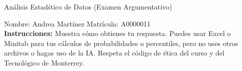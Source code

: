 \documentclass[8pt]{report}
\begin{document}
\newpage



\begin{center}
{An\'alisis Estad\'stico de Datos (Examen Argumentativo)}
\end{center}

Nombre: \underline{\hspace*{.2in}}
Andrea Martínez
\underline{\hspace*{.2in}} \quad Matr\'icula:\underline{\hspace*{.2in}}
A0000011
\underline{\hspace*{.2in}} \\

{\bf Instrucciones:} Muestra c\'omo obtienes tu respuesta. Puedes usar Excel 
o Minitab para tus cálculos de probabilidades o 
percentiles, pero no uses otros archivos o hagas uso de la IA. Respeta el 
c\'odigo de \'etica del curso y del Tecnol\'ogico 
de Monterrey.
\end{document}
